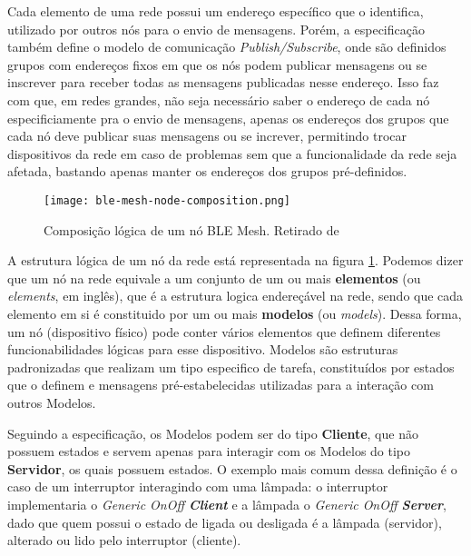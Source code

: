 \documentclass[../monografia.tex]{subfiles}
\begin{document}
Cada elemento de uma rede possui um endereço específico que o identifica, utilizado por outros nós para o envio de mensagens. Porém, a especificação também define o modelo de comunicação \textit{Publish/Subscribe}, onde são definidos grupos com endereços fixos em que os nós podem publicar mensagens ou se inscrever para receber todas as mensagens publicadas nesse endereço. Isso faz com que, em redes grandes, não seja necessário saber o endereço de cada nó especificiamente pra o envio de mensagens, apenas os endereços dos grupos que cada nó deve publicar suas mensagens ou se increver, permitindo trocar dispositivos da rede em caso de problemas sem que a funcionalidade da rede seja afetada, bastando apenas manter os endereços dos grupos pré-definidos.

\begin{figure}[h!]
	\centering
	\texttt{[image: ble-mesh-node-composition.png]}
	\caption{Composição lógica de um nó BLE Mesh. Retirado de \cite{ble-mesh-models}}
	\label{fig:ble-mesh-node-composition}
\end{figure}

A estrutura lógica de um nó da rede está representada na figura \ref{fig:ble-mesh-node-composition}. Podemos dizer que um nó na rede equivale a um conjunto de um ou mais \textbf{elementos} (ou \textit{elements}, em inglês), que é a estrutura logica endereçável na rede, sendo que cada elemento em si é constituido por um ou mais \textbf{modelos} (ou \textit{models}). Dessa forma, um nó (dispositivo físico) pode conter vários elementos que definem diferentes funcionabilidades lógicas para esse dispositivo. Modelos são estruturas padronizadas que realizam um tipo especifico de tarefa, constituídos por estados que o definem e mensagens pré-estabelecidas utilizadas para a interação com outros Modelos.

Seguindo a especificação, os Modelos podem ser do tipo \textbf{Cliente}, que não possuem estados e servem apenas para interagir com os Modelos do tipo \textbf{Servidor}, os quais possuem estados. O exemplo mais comum dessa definição é o caso de um interruptor interagindo com uma lâmpada: o interruptor implementaria o \textit{Generic OnOff \textbf{Client}} e a lâmpada o \textit{Generic OnOff \textbf{Server}}, dado que quem possui o estado de ligada ou desligada é a lâmpada (servidor), alterado ou lido pelo interruptor (cliente).
\end{document}
